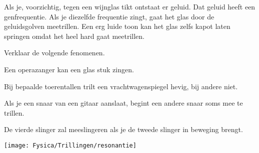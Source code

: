 \documentclass{ximera}
\begin{document}
\begin{example}[Glasbreken] 
    Als je, voorzichtig, tegen een wijnglas tikt ontstaat er geluid. Dat geluid heeft een genfrequentie. Als je diezelfde frequentie zingt, gaat het glas door de geluidsgolven meetrillen. Een erg luide toon kan het glas zelfs kapot laten springen omdat het heel hard gaat meetrillen.
    \begin{center}
    \end{center}
\end{example}

\begin{exercise} 
    Verklaar de volgende fenomenen.
    \begin{question}
        Een operazanger kan een glas stuk zingen.
    \end{question}

        \begin{question}
        Bij bepaalde toerentallen trilt een vrachtwagenspiegel hevig, bij andere niet.
    \end{question}

        \begin{question}
        Als je een snaar van een gitaar aanslaat, begint een andere snaar soms mee te trillen.
    \end{question}

        \begin{question}
        De vierde slinger zal meeslingeren als je de tweede slinger in beweging brengt.
        \begin{center}
    \texttt{[image: Fysica/Trillingen/resonantie]}
\end{center}
    \end{question}
\end{exercise}
\end{document}
